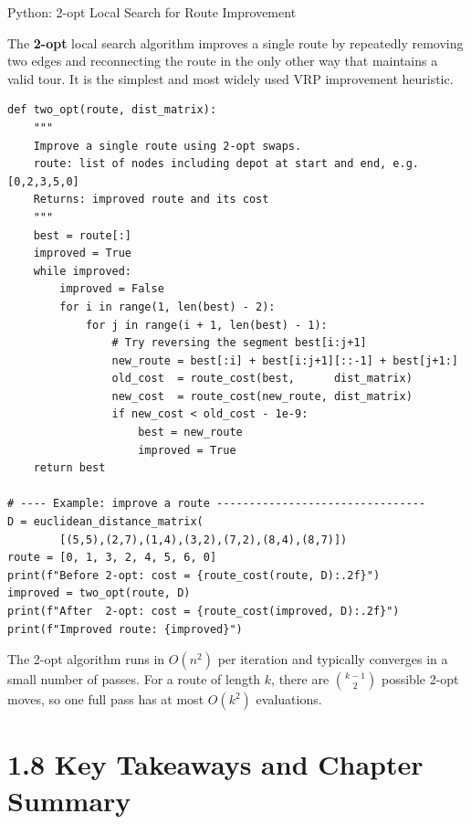 \documentclass[aspectratio=169,10pt]{beamer}
\begin{document}
\begin{frame}[fragile]{Python: 2-opt Local Search for Route Improvement}

The \textbf{2-opt} local search algorithm improves a single route by repeatedly
removing two edges and reconnecting the route in the only other way that maintains
a valid tour.  It is the simplest and most widely used VRP improvement heuristic.

\begin{lstlisting}[caption={2-opt local search for route improvement}]
def two_opt(route, dist_matrix):
    """
    Improve a single route using 2-opt swaps.
    route: list of nodes including depot at start and end, e.g. [0,2,3,5,0]
    Returns: improved route and its cost
    """
    best = route[:]
    improved = True
    while improved:
        improved = False
        for i in range(1, len(best) - 2):
            for j in range(i + 1, len(best) - 1):
                # Try reversing the segment best[i:j+1]
                new_route = best[:i] + best[i:j+1][::-1] + best[j+1:]
                old_cost  = route_cost(best,      dist_matrix)
                new_cost  = route_cost(new_route, dist_matrix)
                if new_cost < old_cost - 1e-9:
                    best = new_route
                    improved = True
    return best

# ---- Example: improve a route --------------------------------
D = euclidean_distance_matrix(
        [(5,5),(2,7),(1,4),(3,2),(7,2),(8,4),(8,7)])
route = [0, 1, 3, 2, 4, 5, 6, 0]
print(f"Before 2-opt: cost = {route_cost(route, D):.2f}")
improved = two_opt(route, D)
print(f"After  2-opt: cost = {route_cost(improved, D):.2f}")
print(f"Improved route: {improved}")
\end{lstlisting}

\medskip
The 2-opt algorithm runs in $O(n^2)$ per iteration and typically converges in a
small number of passes.  For a route of length $k$, there are $\binom{k-1}{2}$
possible 2-opt moves, so one full pass has at most $O(k^2)$ evaluations.

\end{frame}

\section{1.8 Key Takeaways and Chapter Summary}
\end{document}
